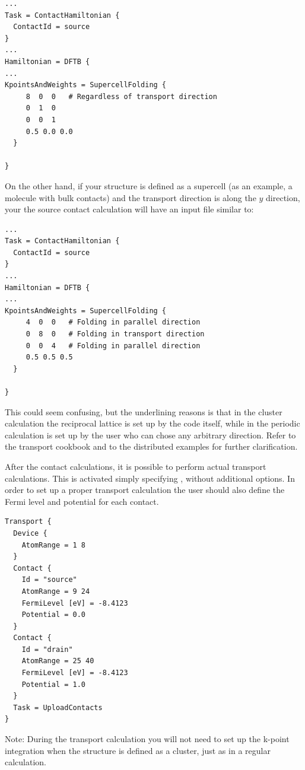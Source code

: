 \begin{verbatim}
...
Task = ContactHamiltonian {
  ContactId = source
}
...
Hamiltonian = DFTB {
...
KpointsAndWeights = SupercellFolding {
     8  0  0   # Regardless of transport direction
     0  1  0
     0  0  1
     0.5 0.0 0.0
  }

}
\end{verbatim}

On the other hand, if your structure is defined as a supercell (as an example, a
molecule with bulk contacts) and the transport direction is along the $y$
direction, your the source contact calculation will have an input file similar
to:

\begin{verbatim}
...
Task = ContactHamiltonian {
  ContactId = source
}
...
Hamiltonian = DFTB {
...
KpointsAndWeights = SupercellFolding {
     4  0  0   # Folding in parallel direction
     0  8  0   # Folding in transport direction
     0  0  4   # Folding in parallel direction
     0.5 0.5 0.5
  }

}
\end{verbatim}


This could seem confusing, but the underlining reasons is that in the cluster
calculation the reciprocal lattice is set up by the code itself, while in the
periodic calculation is set up by the user who can chose any arbitrary
direction.  Refer to the transport cookbook and to the distributed examples for
further clarification.

 After the contact calculations, it is
possible to perform actual transport calculations. This is activated simply
specifying , without additional options. In order to
set up a proper transport calculation the user should also define the Fermi level
and potential for each contact.
\begin{verbatim}
Transport {
  Device {
    AtomRange = 1 8
  }
  Contact {
    Id = "source"
    AtomRange = 9 24
    FermiLevel [eV] = -8.4123
    Potential = 0.0
  }
  Contact {
    Id = "drain"
    AtomRange = 25 40
    FermiLevel [eV] = -8.4123
    Potential = 1.0
  }
  Task = UploadContacts
}
\end{verbatim}

Note: During the transport calculation you will not need to set up the k-point
integration when the structure is defined as a cluster, just as in a regular
\dftbp{} calculation.



